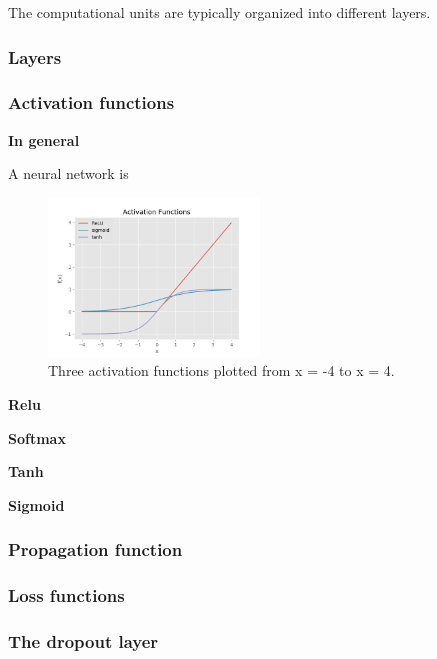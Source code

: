The computational units are typically organized into different layers. 

\subsubsection{Layers}
% 

\subsubsection{Activation functions}

\textbf{In general}

A neural network is 
\begin{figure}
  \centering
    \includegraphics[width=0.5\textwidth]{Assets/Chapter2_Theory/activation_function_overview.png}
    \caption{Three activation functions plotted from x = -4 to x = 4.}
\end{figure}
\textbf{Relu}


\textbf{Softmax}

\textbf{Tanh}

\textbf{Sigmoid}

\subsubsection{Propagation function}

\subsubsection{Loss functions}

\subsubsection{The dropout layer}

% 

